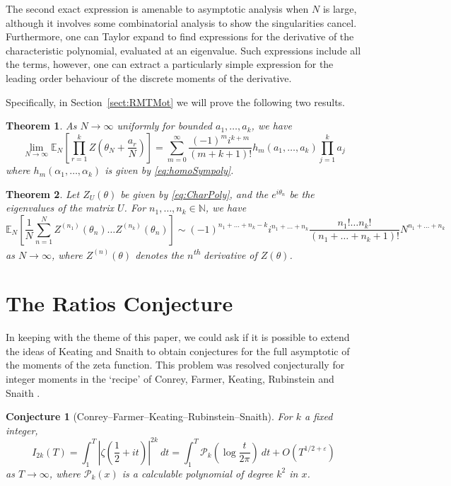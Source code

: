 \documentclass[12pt,a4paper,reqno]{amsart}
\newtheorem{theorem}{Theorem}
\newtheorem{conjecture}{Conjecture}
\theoremstyle{remark}
\numberwithin{equation}{section}
\newcommand{\E}{\mathbb{E}}
\begin{document}
The second exact expression is amenable to asymptotic analysis when $N$ is large, although it involves some combinatorial analysis to show the singularities cancel. Furthermore, one can Taylor expand to find expressions for the derivative of the characteristic polynomial, evaluated at an eigenvalue. Such expressions include all the terms, however, one can extract a particularly simple expression for the leading order behaviour of the discrete moments of the derivative.

Specifically, in Section~\ref{sect:RMTMot} we will prove the following two results.
\begin{theorem}\label{thm:CharPolyShiftsLeadingOrder}
As $N \to \infty$ uniformly for bounded $a_1,\dots,a_k$, we have
\[
\lim_{N \to \infty} \E_N\left[ \prod_{r=1}^k Z\left(\theta_N+\frac{a_r}{N}\right) \right]
=   \sum_{m=0}^\infty \frac{(-1)^{m} i^{k+m}}{(m+k+1)!} h_{m}(a_1,\dots,a_k)   \prod_{j=1}^k a_j
\]
where $h_m(\alpha_1,\dots,\alpha_k)$ is given by \eqref{eq:homoSympoly}.
\end{theorem}

\begin{theorem}\label{thm:CharPolyDeriv}
    Let $Z_U(\theta)$ be given by \eqref{eq:CharPoly}, and the $e^{i\theta_n}$ be the eigenvalues of the matrix $U$. For $n_1,\dots,n_k \in \mathbb{N}$, we have
    \begin{equation*}
    \E_N\left[ \frac{1}{N} \sum_{n=1}^N Z^{(n_1)}(\theta_n)\dots Z^{(n_k)}(\theta_n)\right]
    \sim (-1)^{n_1+\dots+n_k-k} i^{n_1+\dots+n_k} \frac{n_1! \dots n_k!}{(n_1+\dots+n_k+1)!} N^{n_1+\dots+n_k}
    \end{equation*}
    as $N\to\infty$, where $Z^{(n)}(\theta)$ denotes the $n$\textsuperscript{th} derivative of $Z(\theta)$.
\end{theorem}




\section{The Ratios Conjecture}\label{sect:RatHis}

In keeping with the theme of this paper, we could ask if it is possible to extend the ideas of Keating and Snaith \cite{KS00a} to obtain conjectures for the full asymptotic of the moments of the zeta function. This problem was resolved conjecturally for integer moments in the `recipe' of Conrey, Farmer, Keating, Rubinstein and Snaith \cite{CFKRS05}.
	\begin{conjecture}[Conrey--Farmer--Keating--Rubinstein--Snaith]
		For $k$ a fixed integer,
		\begin{equation*}
			I_{2k} (T) = \int_{1}^{T} \left| \zeta \left( \frac{1}{2} + it \right) \right|^{2k} \ dt = \int_{1}^{T} \mathcal{P}_k \left(\log \frac{t}{2\pi} \right) \ dt + O\left(T^{1/2 + \varepsilon} \right)
		\end{equation*}
		as $T \rightarrow \infty$, where $\mathcal{P}_k (x)$ is a calculable polynomial of degree $k^2$ in $x$.
	\end{conjecture}
	
\end{document}
